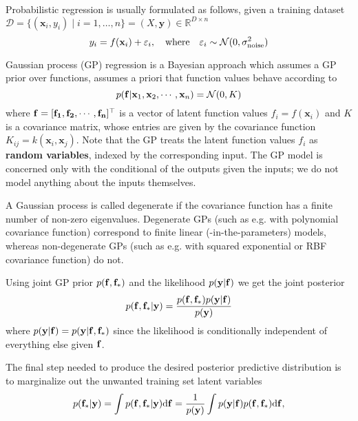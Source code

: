 \documentclass[10pt]{elegantbook}
\begin{document}
Probabilistic regression is usually formulated as follows, given a training dataset 
$\mathcal{D}=\{( \mathbf{x}_{i}, y_{i} ) \mid i=1, \ldots, n \} = (X, \mathbf y) \in \mathbb R^{D \times n}$
\begin{equation}
    y_{i}=f({\bf x}_{i})+\varepsilon_{i},\quad\mathrm{where}\quad\varepsilon_{i}\sim{\mathcal N}(0,\sigma_{\mathrm{noise}}^{2})
\end{equation}

Gaussian process (GP) regression is a Bayesian approach which assumes a GP prior over functions, assumes a priori that function values behave according to
\begin{equation}
    p({\bf f}|{\bf x}_{1},{\bf x}_{2},\cdots,{\bf x}_{n})=\mathcal{N}(0,K)
\end{equation}
where $\bf f = [f_1, f_2, \cdots, f_n]^{\top}$ is a vector of latent function values $f_i = f(\mathbf{x}_i)$ and $K$ is a covariance matrix, whose entries are given by 
the covariance function $K_{ij} = k(\mathbf{x}_i, \mathbf{x}_j)$. Note that the GP treats the
latent function values $f_i$ as \textbf{random variables}, indexed by the corresponding input. The GP model is concerned only
with the conditional of the outputs given the inputs; we do not model anything about the inputs
themselves.

\begin{definition}[Degenerate GP]
    A Gaussian process is called degenerate if the covariance function has a finite number
of non-zero eigenvalues. Degenerate GPs (such as e.g. with polynomial covariance function) correspond to finite linear
(-in-the-parameters) models, whereas non-degenerate GPs (such as e.g. with squared exponential
or RBF covariance function) do not.
\end{definition}

Using joint GP prior $p({\bf f}, {\bf f_{\ast}})$ and the likelihood $p({\bf y} | {\bf f})$ we get the joint posterior
\begin{equation}
    p({\bf f},{\bf f}_{*}|{\bf y})=\frac{p({\bf f},{\bf f}_{*})p({\bf y}|{\bf f})}{p({\bf y})}
\end{equation}
where $p({\bf y} | {\bf f}) = p({\bf y} | {\bf f}, {\bf f_{\ast}})$ since the likelihood is conditionally independent
of everything else given $\bf f$.

The final step needed to produce the desired posterior predictive distribution is to marginalize out
the unwanted training set latent variables
\begin{equation}
    p({\bf f}_{*}|{\bf y})
    =\int p({\bf f},{\bf f}_{*}|{\bf y})\mathrm{d}{\bf f}
    =\frac{1}{p({\bf y})}\int p({\bf y}|{\bf f})p({\bf f},{\bf f}_{*})\mathrm{d}{\bf f},
\end{equation}
\end{document}
